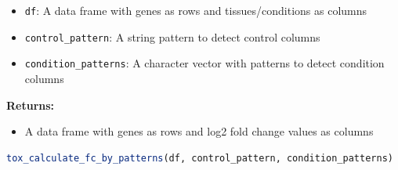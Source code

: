 \begin{enumerate}
          \begin{itemize}
            \item \texttt{df}: A data frame with genes as rows and tissues/conditions
                  as columns
                  
            \item \texttt{control\_pattern}: A string pattern to detect control columns
                  
            \item \texttt{condition\_patterns}: A character vector with patterns to detect
                  condition columns
          \end{itemize}
          
          \textbf{Returns:}
          \begin{itemize}
            \item A data frame with genes as rows and log2 fold change values as columns
          \end{itemize}
          
          \begin{lstlisting}[language=R, caption={R Fold Change Calculation}]
tox_calculate_fc_by_patterns(df, control_pattern, condition_patterns)
          \end{lstlisting}
\end{enumerate}